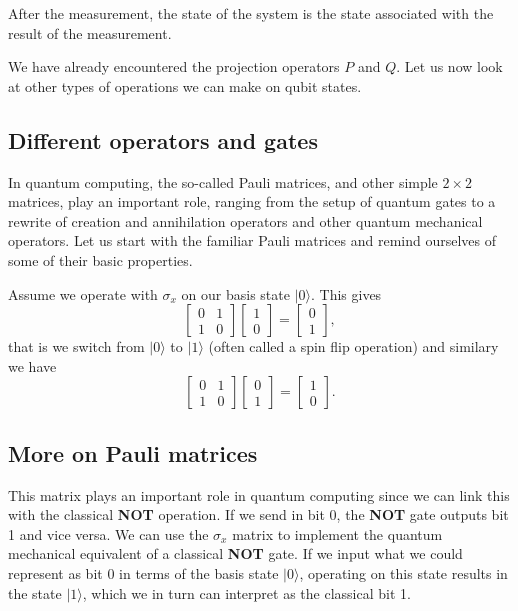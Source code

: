 \noindent
After the measurement, the state of the system is the state associated with the result of the measurement.

We have already encountered the projection operators $P$ and $Q$. Let
us now look at other types of operations we can make on qubit states.

\subsection{Different operators and gates}

In quantum computing, the so-called Pauli matrices, and other simple
$2\times 2$ matrices, play an important role, ranging from the setup
of quantum gates to a rewrite of creation and annihilation operators
and other quantum mechanical operators. Let us start with the familiar
Pauli matrices and remind ourselves of some of their basic properties.

Assume we operate with $\sigma_x$ on our basis state $\vert 0 \rangle$. This gives
\[
\begin{bmatrix} 0 & 1 \\ 1 & 0 \end{bmatrix}\begin{bmatrix} 1 \\ 0 \end{bmatrix}=\begin{bmatrix} 0  \\ 1  \end{bmatrix},
\]
that is we switch from $\vert 0\rangle$ to $\vert 1\rangle$ (often called a spin flip operation) and similary we have
\[
\begin{bmatrix} 0 & 1 \\ 1 & 0 \end{bmatrix}\begin{bmatrix} 0 \\ 1 \end{bmatrix}=\begin{bmatrix} 1  \\ 0  \end{bmatrix}.
\]

\subsection{More on Pauli matrices}

This matrix plays an important role in quantum computing since we can
link this with the classical \textbf{NOT} operation.  If we send in bit 0,
the \textbf{NOT} gate outputs bit 1 and vice versa. We can use the $\sigma_x$
matrix to implement the quantum mechanical equivalent of a classical
\textbf{NOT} gate. If we input what we could represent as bit 0 in terms of
the basis state $\vert 0\rangle$, operating on this state results in
the state $\vert 1\rangle$, which we in turn can interpret as the
classical bit 1.

